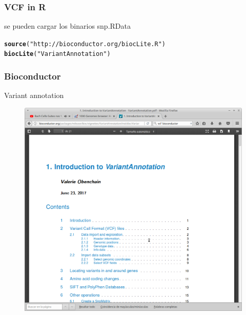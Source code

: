 \documentclass{beamer}\usepackage[]{graphicx}\usepackage[]{color}
\makeatletter
\newcommand{\hlstr}[1]{\textcolor[rgb]{0.192,0.494,0.8}{#1}}%
\newcommand{\hlstd}[1]{\textcolor[rgb]{0.345,0.345,0.345}{#1}}%
\newcommand{\hlkwd}[1]{\textcolor[rgb]{0.737,0.353,0.396}{\textbf{#1}}}%
\newenvironment{kframe}{%
 \def\at@end@of@kframe{}%
 \ifinner\ifhmode%
  \def\at@end@of@kframe{\end{minipage}}%
  \begin{minipage}{\columnwidth}%
 \fi\fi%
 \def\FrameCommand##1{\hskip\@totalleftmargin \hskip-\fboxsep
 \colorbox{shadecolor}{##1}\hskip-\fboxsep
     \hskip-\linewidth \hskip-\@totalleftmargin \hskip\columnwidth}%
 \MakeFramed {\advance\hsize-\width
   \@totalleftmargin\z@ \linewidth\hsize
   \@setminipage}}%
 {\par\unskip\endMakeFramed%
 \at@end@of@kframe}
\newenvironment{knitrout}{}{} %
\makeatother
\begin{document}
\begin{frame}[fragile]
\frametitle{VCF in R}

se pueden cargar los binarios snp.RData
\begin{knitrout}\footnotesize
{}\color{fgcolor}\begin{kframe}
\begin{alltt}
\hlkwd{source}\hlstd{(}\hlstr{"http://bioconductor.org/biocLite.R"}\hlstd{)}
\hlkwd{biocLite}\hlstd{(}\hlstr{"VariantAnnotation"}\hlstd{)}
\end{alltt}
\end{kframe}
\end{knitrout}
\end{frame}



\begin{frame}[fragile]
\frametitle{Bioconductor}
Variant annotation
\begin{figure}[htbp]
\begin{center}
\includegraphics[width=.7\linewidth]{vineta.png}
\end{center}
\end{figure}
\end{frame}
\end{document}
